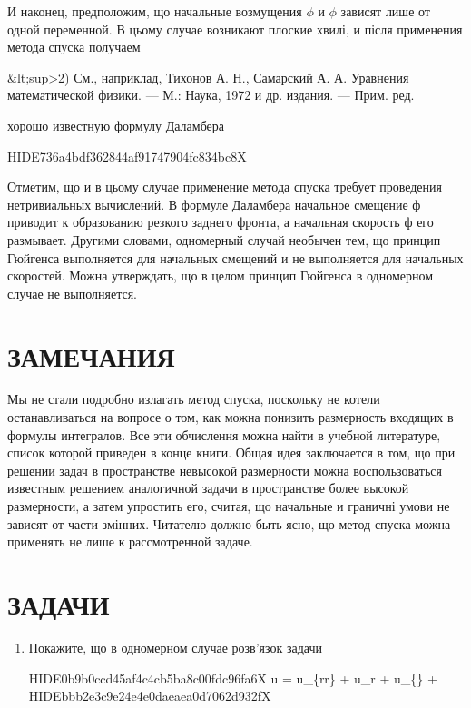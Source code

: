 \documentclass[
  ukrainian,
]{article}
\begin{document}
И наконец, предположим, що начальные возмущения \(\phi\) и \(\phi\)
зависят лише от одной переменной. В цьому случае возникают плоские
хвилі, и після применения метода спуска получаем

\&lt;sup\textgreater2) См., наприклад, Тихонов А. Н., Самарский А. А.
Уравнения математической физики. --- М.: Наука, 1972 и др. издания. ---
Прим. ред.

хорошо известную формулу Даламбера

HIDE736a4bdf362844af91747904fc834bc8X

Отметим, що и в цьому случае применение метода спуска требует проведения
нетривиальных вычислений. В формуле Даламбера начальное смещение ф
приводит к образованию резкого заднего фронта, а начальная скорость ф
его размывает. Другими словами, одномерный случай необычен тем, що
принцип Гюйгенса выполняется для начальных смещений и не выполняется для
начальных скоростей. Можна утверждать, що в целом принцип Гюйгенса в
одномерном случае не выполняется.

\section{ЗАМЕЧАНИЯ}\label{ux437ux430ux43cux435ux447ux430ux43dux438ux44f-5}

Мы не стали подробно излагать метод спуска, поскольку не котели
останавливаться на вопросе о том, как можна понизить размерность
входящих в формулы интегралов. Все эти обчислення можна найти в учебной
литературе, список которой приведен в конце книги. Общая идея
заключается в том, що при решении задач в пространстве невысокой
размерности можна воспользоваться известным решением аналогичной задачи
в пространстве более высокой размерности, а затем упростить его, считая,
що начальные и граничні умови не зависят от части змінних. Читателю
должно быть ясно, що метод спуска можна применять не лише к
рассмотренной задаче.

\section{ЗАДАЧИ}\label{ux437ux430ux434ux430ux447ux438-3}

\begin{enumerate}
\def\labelenumi{\arabic{enumi}.}
\item
  Покажите, що в одномерном случае розв'язок задачи

  HIDE0b9b0ccd45af4c4cb5ba8c00fdc96fa6X \Delta u = u\_\{rr\} +
  u\_r + u\_\{\theta\theta\} +
  HIDEbbb2e3c9e24e4e0daeaea0d7062d932fX
\end{enumerate}
\end{document}

